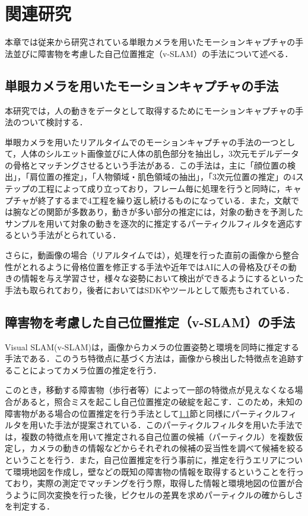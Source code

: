 \documentclass[11pt]{jreport}
\begin{document}
\chapter{関連研究}
本章では従来から研究されている単眼カメラを用いたモーションキャプチャの手法並びに障害物を考慮した自己位置推定（v-SLAM）の手法について述べる．

\section{単眼カメラを用いたモーションキャプチャの手法}\label{rep1}
本研究では，人の動きをデータとして取得するためにモーションキャプチャの手法のついて検討する．

単眼カメラを用いたリアルタイムでのモーションキャプチャの手法の一つとして，人体のシルエット画像並びに人体の肌色部分を抽出し，3次元モデルデータの骨格とマッチングさせるという手法がある\cite{the-1}．この手法は，主に「顔位置の検出」，「肩位置の推定」，「人物領域・肌色領域の抽出」，「3次元位置の推定」の4ステップの工程によって成り立っており，フレーム毎に処理を行うと同時に，キャプチャが終了するまで4工程を繰り返し続けるものになっている．また，文献\cite{the-1}では腕などの関節が多数あり，動きが多い部分の推定には，対象の動きを予測したサンプルを用いて対象の動きを逐次的に推定するパーティクルフィルタを適応するという手法がとられている．

さらに，動画像の場合（リアルタイムでは），処理を行った直前の画像から整合性がとれるように骨格位置を修正する手法や近年ではAIに人の骨格及びその動きの情報を与え学習させ，様々な姿勢において検出ができるようにするといった手法\cite{the-2}も取られており，後者においてはSDKやツールとして販売もされている．

\section{障害物を考慮した自己位置推定（v-SLAM）の手法}
Visual SLAM(v-SLAM)は，画像からカメラの位置姿勢と環境を同時に推定する手法である．このうち特徴点に基づく方法は，画像から検出した特徴点を追跡することによってカメラ位置の推定を行う．

このとき，移動する障害物（歩行者等）によって一部の特徴点が見えなくなる場合があると，照合ミスを起こし自己位置推定の破綻を起こす．このため，未知の障害物がある場合の位置推定を行う手法として\ref{rep1}節と同様にパーティクルフィルタを用いた手法が提案されている\cite{the-3}．このパーティクルフィルタを用いた手法では，複数の特徴点を用いて推定される自己位置の候補（パーティクル）を複数仮定し，カメラの動きの情報などからそれぞれの候補の妥当性を調べて候補を絞るということを行う．また，自己位置推定を行う事前に，推定を行うエリアについて環境地図を作成し，壁などの既知の障害物の情報を取得するということを行っており，実際の測定でマッチングを行う際，取得した情報と環境地図の位置が合うように同次変換を行った後，ピクセルの差異を求めパーティクルの確からしさを判定する．
\end{document}
